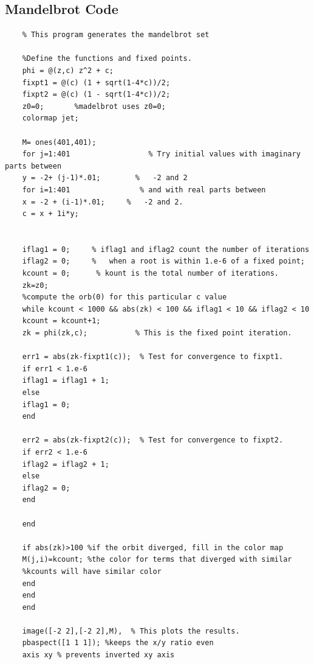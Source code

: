 \documentclass[12pt]{article}
\begin{document}
	\subsection{Mandelbrot Code}\label{mandelbrot}
	\begin{verbatim}
	% This program generates the mandelbrot set
	
	%Define the functions and fixed points.
	phi = @(z,c) z^2 + c;
	fixpt1 = @(c) (1 + sqrt(1-4*c))/2;
	fixpt2 = @(c) (1 - sqrt(1-4*c))/2;
	z0=0;       %madelbrot uses z0=0;
	colormap jet;
	
	M= ones(401,401);
	for j=1:401                  % Try initial values with imaginary parts between
	y = -2+ (j-1)*.01;        %   -2 and 2
	for i=1:401                % and with real parts between
	x = -2 + (i-1)*.01;     %   -2 and 2.
	c = x + 1i*y;
	
	
	iflag1 = 0;     % iflag1 and iflag2 count the number of iterations
	iflag2 = 0;     %   when a root is within 1.e-6 of a fixed point;
	kcount = 0;      % kount is the total number of iterations.
	zk=z0;
	%compute the orb(0) for this particular c value
	while kcount < 1000 && abs(zk) < 100 && iflag1 < 10 && iflag2 < 10
	kcount = kcount+1;
	zk = phi(zk,c);           % This is the fixed point iteration.
	
	err1 = abs(zk-fixpt1(c));  % Test for convergence to fixpt1.
	if err1 < 1.e-6
	iflag1 = iflag1 + 1;
	else
	iflag1 = 0;
	end
	
	err2 = abs(zk-fixpt2(c));  % Test for convergence to fixpt2.
	if err2 < 1.e-6
	iflag2 = iflag2 + 1;
	else
	iflag2 = 0;
	end
	
	end
	
	if abs(zk)>100 %if the orbit diverged, fill in the color map
	M(j,i)=kcount; %the color for terms that diverged with similar
	%kcounts will have similar color
	end
	end
	end
	
	image([-2 2],[-2 2],M),  % This plots the results.
	pbaspect([1 1 1]); %keeps the x/y ratio even
	axis xy % prevents inverted xy axis
	\end{verbatim}

	
\end{document}
